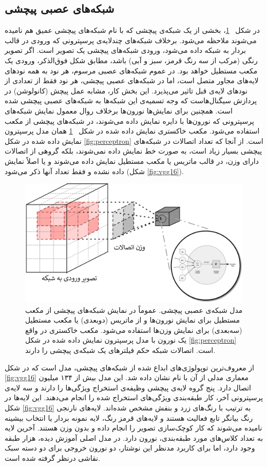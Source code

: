 \documentclass[11pt, twoside]{imsproc}
\let\LTRfootnote\footnoteA
\begin{document}
\subsection{شبکه‌های عصبی پیچشی }
\label{sec:CNNs}
در شکل
~\ref{fig:CNN}، 
بخشی از یک شبکه‌ی پیچشی که با نام شبکه‌های پیچشی عمیق هم نامیده می‌شوند ملاحظه می‌شود. برخلاف شبکه‌های چندلایه‌ی پرسپترونی که ورودی در قالب بردار به شبکه داده می‌شود، ورودی شبکه‌های پیچشی یک تصویر است. اگر تصویر رنگی (مرکب از سه رنگ قرمز، سبز و آبی) باشد، مطابق شکل فوق‌الذکر، ورودی یک مکعب مستطیل خواهد بود.
در عموم شبکه‌های عصبی مرسوم، هر نود به همه نودهای لایه‌های مجاور متصل است، اما  در شبکه‌های عصبی پیچشی، هر نود فقط از تعدادی از نودهای لایه‌ی قبل تاثیر می‌پذیرد. این بخش کار، مشابه عمل پیچش (کانولوشن)‌ در پردازش سیگنال‌هاست که وجه تسمیه‌ی این شبکه‌ها به شبکه‌های عصبی پیچشی شده است.
همچنین برای نمایش‌ها نورون‌ها برخلاف روال معمول نمایش شبکه‌های پرسپترونی که نورون‌ها با دایره نمایش داده می‌شوند، در شبکه‌های پیچشی از مکعب استفاده می‌شود. مکعب خاکستری نمایش داده شده در شکل
~\ref{fig:CNN}
همان مدل پرسپترون نمایش داده شده در شکل
\ref{fig:perceptron}
است.  از آنجا که تعداد اتصالات در شبکه‌های پیچشی بسیار زیاد است، به صورت خط نمایش داده نمی‌شوند، بلکه گروهی از اتصالات دارای وزن‌، در قالب ماتریس یا مکعب مستطیل نمایش داده می‌شوند و یا اصلاً نمایش داده نشده و فقط تعداد آنها ذکر می‌شود
(شکل 
\ref{fig:vgg16}).

\begin{figure}[t]
\centering
\includegraphics[width=.6\linewidth]{images/CNN1}
\caption{مدل شبکه‌ی عصبی پیچشی.
عموماً در نمایش شبکه‌های پیچشی از مکعب مستطیل برای نمایش نورون‌ها و از ماتریس (دوبعدی) یا مکعب مستطیل (سه‌بعدی) برای نمایش وزن‌ها استفاده می‌شود. مکعب خاکستری در واقع یک نورون با مدل پرسپترون نمایش داده شده در شکل
\ref{fig:perceptron}
است. اتصالات شبکه حکم فیلترهای یک شبکه‌ی پیچشی را دارند.
}
\label{fig:CNN}
\end{figure}



  از معروف‌ترین توپولوژی‌های ابداع شده از شبکه‌های پیچشی، مدل
\cite{VGG_Simonyan15}
است که در
شکل
\ref{fig:vgg16}
معماری مدلی از آن با نام
نشان داده شد.
این مدل بیش از ۱۳۴ میلیون اتصال دارد. پنج گروه لایه‌ی پیچشی وظیفه‌ی استخراج ویژگی‌ها را دارند و سه لایه‌ی پرسپترونی آخر، کار طبقه‌بندی ویژگی‌های استخراج شده را انجام می‌دهند. این لایه‌ها در شکل
\ref{fig:vgg16}
به ترتیب با رنگ‌های زرد و بنفش مشخص شده‌اند. لایه‌های نارنجی رنگ بیانگر تابع فعالیت هستند و لایه‌های قرمز رنگ، لایه نمونه بردار یا انتخاب بیشینه %
نامیده می‌شوند که کار کوچک‌سازی تصویر را انجام داده و بدون وزن هستند. آخرین لایه به تعداد کلاس‌های مورد طبقه‌بندی، نورون دارد. در مدل اصلی آموزش دیده، هزار طبقه وجود دارد، اما برای کاربرد مدنظر این نوشتار، دو نورون خروجی برای دو دسته سبک نقاشی درنظر گرفته شده است.
\end{document}
